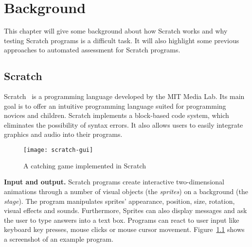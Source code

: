 
\chapter{Background}%
\label{cha:background}

This chapter will give some background about how Scratch works and why testing Scratch programs is a difficult task.
It will also highlight some previous approaches to automated assessment for Scratch programs.

\section{Scratch}%
\label{sec:scratch}


Scratch~\cite{scratch} is a programming language developed by the MIT Media Lab.
Its main goal is to offer an intuitive programming language suited for programming novices and children.
Scratch implements a block-based code system, which eliminates the possibility of syntax errors.
It also allows users to easily integrate graphics and audio into their programs.
\parspace

\begin{figure}[h]
    \centering
    \texttt{[image: scratch-gui]}
    \caption{A catching game implemented in Scratch}
    \label{fig:scratch-gui}
\end{figure}

\textbf{Input and output.}
Scratch programs create interactive two-dimensional animations through a number of visual objects (the \textit{sprites}) on a background (the \textit{stage}).
The program manipulates sprites' appearance, position, size, rotation, visual effects and sounds.
Furthermore, Sprites can also display messages and ask the user to type answers into a text box.
Programs can react to user input like keyboard key presses, mouse clicks or mouse cursor movement.
Figure~\ref{fig:scratch-gui} shows a screenshot of an example program.
\parspace

